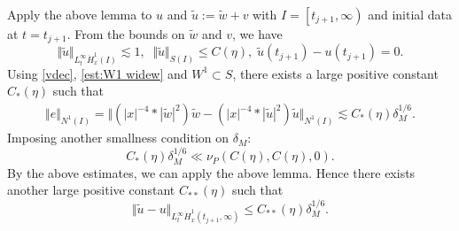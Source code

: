 \documentclass[reqno, 11pt]{amsart}
\numberwithin{equation}{section}
\theoremstyle{plain}
\theoremstyle{definition}
\numberwithin{equation}{section}
\numberwithin{theorem}{section}
\numberwithin{equation}{section}
\numberwithin{equation}{section}
\numberwithin{theorem}{section}
\begin{document}
	Apply the above lemma to $u$ and $\widetilde{u}:=\widetilde{w}+v$ with $I=\left[t_{j+1},\infty \right)$ and initial data at $t=t_{j+1}$. From the bounds on $\widetilde{w}$ and $v$, we have
	\begin{equation*}
	\Vert \widetilde{u} \Vert_{L_{t}^{\infty} \dot H_x^1(I)}\lesssim 1, \;\; \Vert \widetilde{u} \Vert_{S(I)}\leq C
	(\eta),\;  \widetilde{u}(t_{j+1})-u(t_{j+1}) =0.
	\end{equation*} 
	Using \eqref{vdec}, \eqref{est:W1 widew} and $W^1\subset S$, there exists a large positive constant $C_*(\eta)$ such that 
	\begin{equation*}
	\begin{aligned}
	\Vert e \Vert_{N^1(I)}=\Vert \left(|x|^{-4}*|\widetilde{w}|^2\right)\widetilde{w} - \left(|x|^{-4}*|\widetilde{u}|^2\right)\widetilde{u}  \Vert_{N^1(I)}\lesssim C_*(\eta)\delta_{M}^{1/6} .
	\end{aligned}
	\end{equation*} 
	Imposing another smallness condition on $\delta_{M}$:
	\begin{equation}\label{con:scat 4}
	C_*(\eta)\delta_{M}^{1/6} \ll \nu_P \left( C(\eta),C(\eta),0 \right).
	\end{equation}
	By the above estimates, we can apply the above lemma. Hence there exists another large positive constant $C_{**}(\eta)$ such that
	\begin{equation}\label{appro wideu}
	\Vert \widetilde{u}-u \Vert_{L_{t}^{\infty} \dot{H}_{x}^{1}(t_{j+1},\infty)} \leq C_{**}(\eta)\delta_{M}^{1/6}.
	\end{equation}
	
\end{document}
